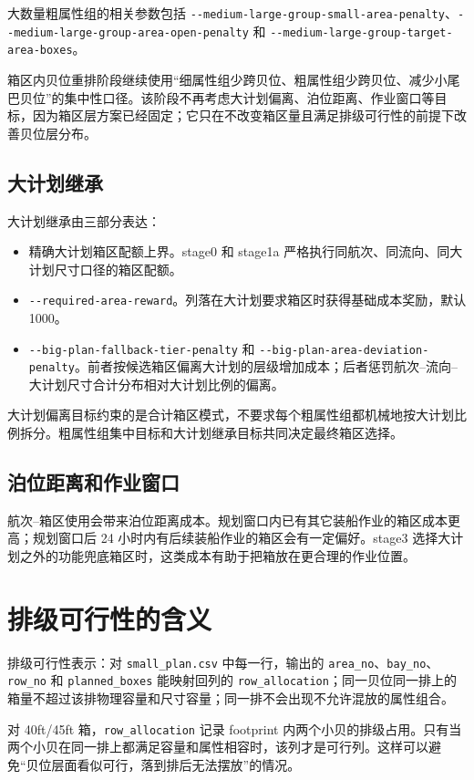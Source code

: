 \documentclass[UTF8,a4paper,11pt]{ctexart}
\newcommand{\code}[1]{\nolinkurl{#1}}
\begin{document}
大数量粗属性组的相关参数包括 \code{--medium-large-group-small-area-penalty}、\code{--medium-large-group-area-open-penalty} 和 \code{--medium-large-group-target-area-boxes}。

箱区内贝位重排阶段继续使用“细属性组少跨贝位、粗属性组少跨贝位、减少小尾巴贝位”的集中性口径。该阶段不再考虑大计划偏离、泊位距离、作业窗口等目标，因为箱区层方案已经固定；它只在不改变箱区量且满足排级可行性的前提下改善贝位层分布。

\subsection{大计划继承}

大计划继承由三部分表达：
\begin{itemize}
  \item 精确大计划箱区配额上界。stage0 和 stage1a 严格执行同航次、同流向、同大计划尺寸口径的箱区配额。
  \item \code{--required-area-reward}。列落在大计划要求箱区时获得基础成本奖励，默认 1000。
  \item \code{--big-plan-fallback-tier-penalty} 和 \code{--big-plan-area-deviation-penalty}。前者按候选箱区偏离大计划的层级增加成本；后者惩罚航次--流向--大计划尺寸合计分布相对大计划比例的偏离。
\end{itemize}

大计划偏离目标约束的是合计箱区模式，不要求每个粗属性组都机械地按大计划比例拆分。粗属性组集中目标和大计划继承目标共同决定最终箱区选择。

\subsection{泊位距离和作业窗口}

航次--箱区使用会带来泊位距离成本。规划窗口内已有其它装船作业的箱区成本更高；规划窗口后 24 小时内有后续装船作业的箱区会有一定偏好。stage3 选择大计划之外的功能兜底箱区时，这类成本有助于把箱放在更合理的作业位置。

\section{排级可行性的含义}

排级可行性表示：对 \code{small_plan.csv} 中每一行，输出的 \code{area_no}、\code{bay_no}、\code{row_no} 和 \code{planned_boxes} 能映射回列的 \code{row_allocation}；同一贝位同一排上的箱量不超过该排物理容量和尺寸容量；同一排不会出现不允许混放的属性组合。

对 40ft/45ft 箱，\code{row_allocation} 记录 footprint 内两个小贝的排级占用。只有当两个小贝在同一排上都满足容量和属性相容时，该列才是可行列。这样可以避免“贝位层面看似可行，落到排后无法摆放”的情况。
\end{document}
